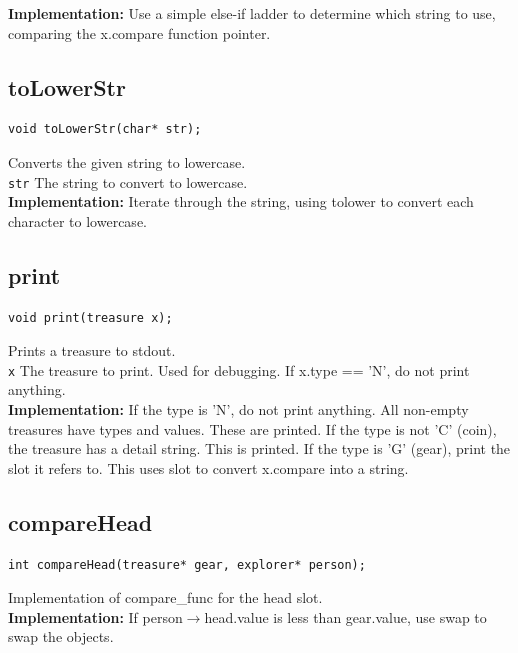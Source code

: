 \documentclass{article}
\begin{document}
 
 \textbf{Implementation:}
Use a simple else-if ladder to determine which string to use,
comparing the  x.compare function pointer.
 

\subsection{toLowerStr}
\begin{lstlisting}
void toLowerStr(char* str);
\end{lstlisting}


  Converts the given string to lowercase.\\ 
 \texttt{str} The string to convert to lowercase.\\ 
 
 
 \textbf{Implementation:}
Iterate through the string, using  tolower to convert
each character to lowercase.
 

\subsection{print}
\begin{lstlisting}
void print(treasure x);
\end{lstlisting}


  Prints a treasure to stdout.\\ 
 \texttt{x} The treasure to print.
  Used for debugging. If  x.type == 'N',
     do not print anything.\\ 
 
 
 \textbf{Implementation:}
If the type is 'N', do not print anything.
All non-empty  treasures have types and values.
These are printed.
If the type is not 'C' (coin), the treasure has a detail string.
This is printed.
If the type is 'G' (gear), print the slot it refers to.
     This uses  slot to convert  x.compare into a string.
 

\subsection{compareHead}
\begin{lstlisting}
int compareHead(treasure* gear, explorer* person);
\end{lstlisting}


  Implementation of  compare\_func for the head slot.\\ 
 
 
 \textbf{Implementation:}
If  person$\rightarrow$head.value is less than  gear.value,
use  swap to swap the objects.
 
\end{document}
